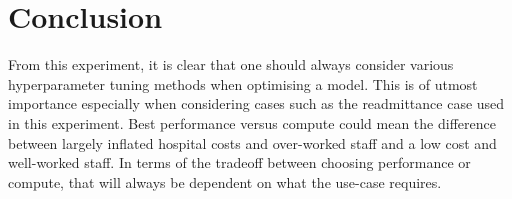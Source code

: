 \section{Conclusion}

From this experiment, it is clear that one should always consider various hyperparameter tuning methods when optimising a model. This is of utmost importance especially when considering cases
such as the readmittance case used in this experiment. Best performance versus compute could mean the difference between largely inflated hospital costs and over-worked staff and a 
low cost and well-worked staff. In terms of the tradeoff between choosing performance or compute, that will always be dependent on what the use-case requires.